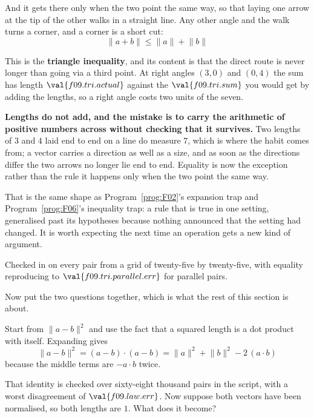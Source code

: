 \begin{fr}
And it gets there only when the two point the same way, so that laying one
arrow at the tip of the other walks in a straight line. Any other angle and
the walk turns a corner, and a corner is a short cut:
\[ \lVert a + b \rVert \le \lVert a \rVert + \lVert b \rVert \]

This is the \textbf{triangle inequality}, and its content is that the direct
route is never longer than going via a third point. At right angles \dash{}
$(3, 0)$ and $(0, 4)$ \dash{} the sum has length $\val{f09.tri.actual}$
against the $\val{f09.tri.sum}$ you would get by adding the lengths, so a
right angle costs two units of the seven.

\begin{trapbox}
\textbf{Lengths do not add, and the mistake is to carry the arithmetic of
positive numbers across without checking that it survives.} Two lengths of $3$
and $4$ laid end to end on a line do measure $7$, which is where the habit
comes from; a vector carries a direction as well as a size, and as soon as the
directions differ the two arrows no longer lie end to end. Equality is now the
exception rather than the rule \dash{} it happens only when the two point the
same way.

That is the same shape as Program~\ref{prog:F02}'s expansion trap and
Program~\ref{prog:F06}'s inequality trap: a rule that is true in one setting,
generalised past its hypotheses because nothing announced that the setting had
changed. It is worth expecting the next time an operation gets a new kind of
argument.

Checked in  on every pair from a grid of
twenty-five by twenty-five, with equality reproducing to
$\val{f09.tri.parallel.err}$ for parallel pairs.
\end{trapbox}
\end{fr}

\begin{fr}
Now put the two questions together, which is what the rest of this section is
about.

Start from $\lVert a - b \rVert^{2}$ and use the fact that a squared length is
a dot product with itself. Expanding gives
\[ \lVert a - b \rVert^{2} = (a - b) \cdot (a - b)
   = \lVert a \rVert^{2} + \lVert b \rVert^{2} - 2\,(a \cdot b) \]
because the middle terms are $-a \cdot b$ twice.

That identity is checked over sixty-eight thousand pairs in the script, with a
worst disagreement of $\val{f09.law.err}$. Now suppose both vectors have been
normalised, so both lengths are $1$. What does it become?
\nextframe
\end{fr}

